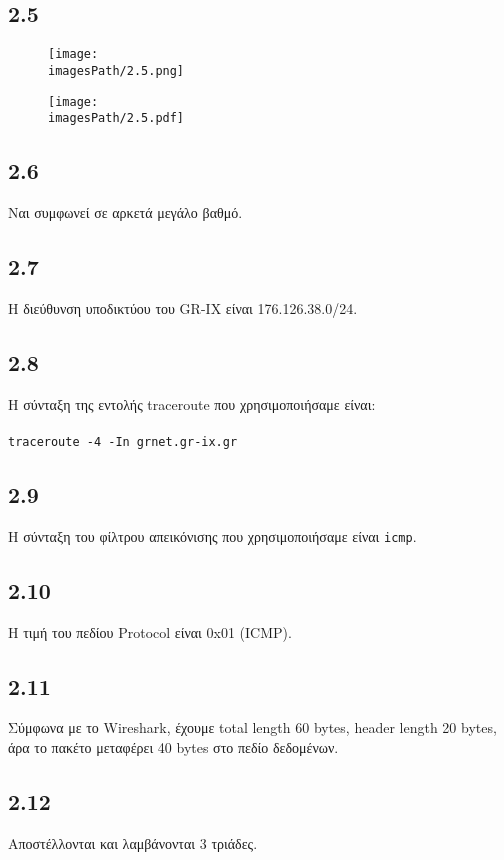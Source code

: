 		\subsection*{2.5}
			\begin{figure}[H]
				\texttt{[image: \\imagesPath/2.5.png]}
			\end{figure}
		
			\begin{figure}[H]
				\texttt{[image: \\imagesPath/2.5.pdf]}
			\end{figure}
		
		\subsection*{2.6}
			Ναι συμφωνεί σε αρκετά μεγάλο βαθμό.
		
		\subsection*{2.7}
			Η διεύθυνση υποδικτύου του GR-IX είναι 176.126.38.0/24.
		
		\subsection*{2.8}
			Η σύνταξη της εντολής traceroute που χρησιμοποιήσαμε είναι: \\~\\
			\verb|traceroute -4 -In grnet.gr-ix.gr|
		
		\subsection*{2.9}
			Η σύνταξη του φίλτρου απεικόνισης που χρησιμοποιήσαμε είναι \verb|icmp|.
		
		\subsection*{2.10}
			Η τιμή του πεδίου Protocol είναι 0x01 (ICMP).
		
		\subsection*{2.11}
			Σύμφωνα με το Wireshark, έχουμε total length 60 bytes, header length 20 bytes, άρα το πακέτο μεταφέρει 40 bytes στο πεδίο δεδομένων.
		
		\subsection*{2.12}
			Αποστέλλονται και λαμβάνονται 3 τριάδες.
		
